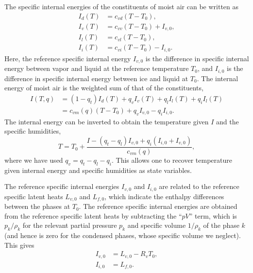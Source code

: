\documentclass{report}
\begin{document}
The specific internal energies of the constituents of moist air can be written as
\begin{subequations}\label{e:internal_energies}
\begin{align}
I_d(T) & = c_{vd} (T - T_0),  \\
I_v(T) & = c_{vv} (T - T_0) + I_{v,0},\\
I_l(T) & = c_{vl} (T - T_0), \\
I_i(T) & = c_{vi} (T - T_0) - I_{i,0}.
\end{align}
\end{subequations}
Here, the reference specific internal energy $I_{v,0}$ is the difference in specific internal energy between vapor and liquid at the reference temperature $T_0$, and $I_{i,0}$ is the difference in specific internal energy between ice and liquid at $T_0$. The internal energy of moist air is the weighted sum of that of the constituents,
\begin{equation}
\begin{split}
     I(T, q) & = (1-q_t) I_d(T) + q_v I_v(T) + q_l I_l(T) + q_i I_l(T)\\
          & = c_{vm}(q) (T - T_0)  + q_v I_{v,0} - q_i I_{i,0}.
     \label{e:total_internal_energy}
\end{split}
\end{equation}
The internal energy can be inverted to obtain the temperature given $I$ and the specific humidities,
\begin{equation}
    T = T_0 + \frac{I - (q_t - q_l) I_{v,0} + q_i (I_{i,0} + I_{v,0})}{c_{vm}(q)},
    \label{e:temperature}
\end{equation}
where we have used $q_v = q_t - q_l - q_i$. This allows one to recover temperature given internal energy and specific humidities as state variables.

The reference specific internal energies $I_{v,0}$ and $I_{i,0}$ are related to the reference specific latent heats $L_{v,0}$ and $L_{f,0}$, which indicate the enthalpy differences between the phases at $T_0$. The reference specific internal energies are obtained from the reference specific latent heats by subtracting the ``$pV$'' term, which is $p_k/\rho_k$ for the relevant partial pressure $p_k$ and specific volume $1/\rho_k$ of the phase $k$ (and hence is zero for the condensed phases, whose specific volume we neglect). This gives
\begin{subequations}\label{e:ref_internal_energies}
\begin{align}
     I_{v,0} &= L_{v, 0} - R_v T_0,\\
     I_{i,0} &= L_{f, 0}.
\end{align}
\end{subequations}
   
\end{document}
